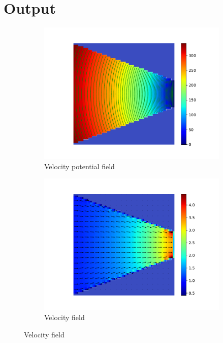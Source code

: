 \section{Output}
\begin{figure}[htbp]
      \centering
      \begin{subfigure}{.45\textwidth}
            \includegraphics[width=.99\linewidth]{alpha_v2/figures/potential_shrinkage_Nx=60_Ny=60.pdf}
            \caption{Velocity potential field}\label{fig:vel_pot_field}
      \end{subfigure}
      \begin{subfigure}{.45\textwidth}
            \includegraphics[width=.99\linewidth]{alpha_v2/figures/velocity_shrinkage_Nx=60_Ny=60.pdf}
            \caption{Velocity field}\label{fig:velocity_field}
      \end{subfigure}


\end{figure}

